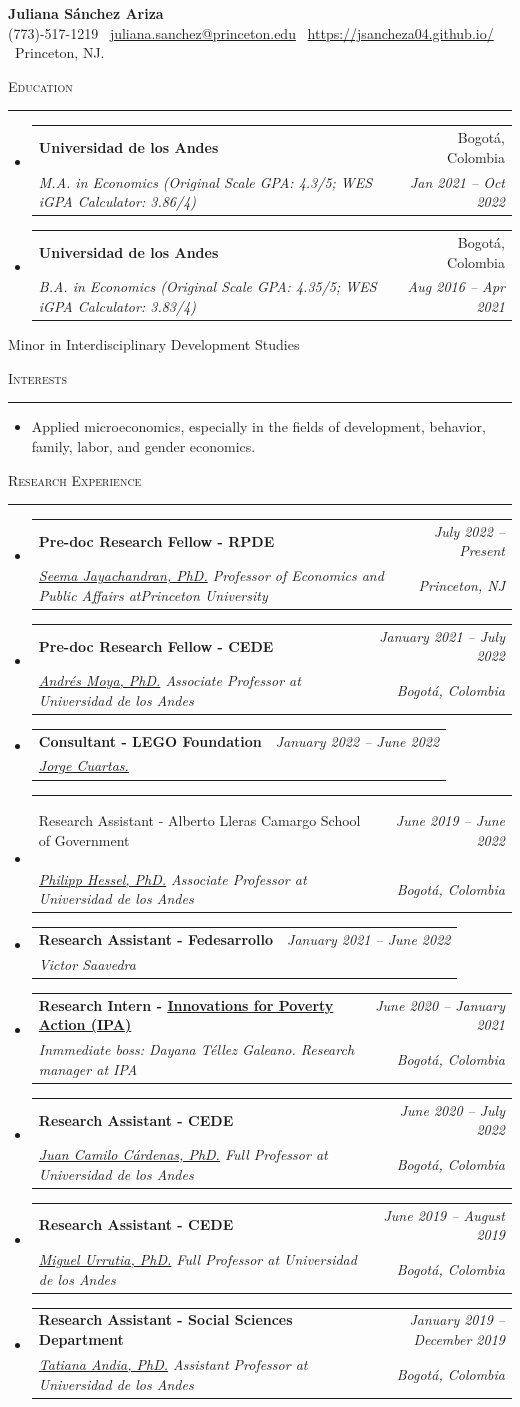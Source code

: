\documentclass[11pt,letterpaper]{article}
\makeatletter
\newcommand{\cvsection}[1]{%
  \vspace{11pt}%
  {\Large\scshape #1\par}%
  \vspace{3pt}\hrule\vspace{6pt}%
}
\newcommand{\entryliststart}{%
  \begin{itemize}[leftmargin=0.15in,label={},topsep=0pt,partopsep=0pt,
                  itemsep=0pt,parsep=0pt]
}
\newcommand{\entrylistend}{\end{itemize}}
\newcommand{\cventry}[4]{%
  \item
  \begin{tabular*}{0.97\textwidth}[t]{@{}p{0.71\textwidth}@{\extracolsep{\fill}}r@{}}
    {\raggedright\large\bfseries #1} & {\large #2} \\
    {\raggedright\itshape #3} & {\itshape #4} \\
  \end{tabular*}\vspace{5pt}%
}
\newcommand{\cvtextliststart}{%
  \begin{itemize}[leftmargin=0.15in,label={},topsep=0pt,partopsep=0pt,
                  itemsep=0pt,parsep=0pt]
}
\newcommand{\cvtextitem}[1]{\item #1\vspace{3pt}}
\newcommand{\cvtextlistend}{\end{itemize}}
\newcommand{\cvminor}[1]{%
  {\hspace*{16.08pt}\textbullet\hspace{5.85pt}#1\par}%
}
\makeatother
\begin{document}
\begin{center}
  {\Huge\bfseries Juliana S\'anchez Ariza}\\[-1pt]
  (773)-517-1219 \textbar\ 
  \href{mailto:juliana.sanchez@princeton.edu}{juliana.sanchez@princeton.edu}
  \textbar\ 
  \href{https://jsancheza04.github.io/}{https://jsancheza04.github.io/}
  \textbar\ Princeton, NJ.
\end{center}
\vspace{1pt}

\cvsection{Education}
\entryliststart
  \cventry{Universidad de los Andes}{Bogot\'a, Colombia}
    {M.A. in Economics (Original Scale GPA: 4.3/5; WES iGPA Calculator: 3.86/4)}
    {Jan 2021 -- Oct 2022}
  \cventry{Universidad de los Andes}{Bogot\'a, Colombia}
    {B.A. in Economics (Original Scale GPA: 4.35/5; WES iGPA Calculator: 3.83/4)}
    {Aug 2016 -- Apr 2021}
\entrylistend
\cvminor{Minor in Interdisciplinary Development Studies}

\cvsection{Interests}
\cvtextliststart
  \cvtextitem{Applied microeconomics, especially in the fields of development, behavior, family, labor, and gender economics.}
\cvtextlistend

\cvsection{Research Experience}
\entryliststart
  \cventry{Pre-doc Research Fellow - RPDE}{\textit{July 2022 -- Present}}
    {\href{https://seemajayachandran.com/}{Seema Jayachandran, PhD.} Professor of Economics and Public Affairs at\newline Princeton University}
    {Princeton, NJ}
  \cventry{Pre-doc Research Fellow - CEDE}{\textit{January 2021 -- July 2022}}
    {\href{https://economia.uniandes.edu.co/moya}{Andr\'es Moya, PhD.} Associate Professor at Universidad de los Andes}
    {Bogot\'a, Colombia}
  \cventry{Consultant - LEGO Foundation}{\textit{January 2022 -- June 2022}}
    {\href{https://scholar.harvard.edu/jorgecuartas/home}{Jorge Cuartas.}}
    {}
  \cventry{\parbox[t]{325pt}{\raggedright Research Assistant - Alberto Lleras Camargo School of Government}}
    {\textit{June 2019 -- June 2022}}
    {\href{https://scholar.google.com.co/citations?user=J4swKxAAAAAJ\&hl=en}{Philipp Hessel, PhD.} Associate Professor at Universidad de los Andes}
    {Bogot\'a, Colombia}
  \cventry{Research Assistant - Fedesarrollo}{\textit{January 2021 -- June 2022}}
    {Victor Saavedra}
    {}
  \cventry{Research Intern - \href{https://www.poverty-action.org/}{Innovations for Poverty Action (IPA)}}
    {\textit{June 2020 -- January 2021}}
    {Inmmediate boss: Dayana T\'ellez Galeano. Research manager at IPA}
    {Bogot\'a, Colombia}
  \cventry{Research Assistant - CEDE}{\textit{June 2020 -- July 2022}}
    {\href{https://economia.uniandes.edu.co/cardenas}{Juan Camilo C\'ardenas, PhD.} Full Professor at Universidad de los Andes}
    {Bogot\'a, Colombia}
  \cventry{Research Assistant - CEDE}{\textit{June 2019 -- August 2019}}
    {\href{https://economia.uniandes.edu.co/profesores/miguel-urrutia}{Miguel Urrutia, PhD.} Full Professor at Universidad de los Andes}
    {Bogot\'a, Colombia}
  \cventry{Research Assistant - Social Sciences Department}{\textit{January 2019 -- December 2019}}
    {\href{https://cienciassociales.uniandes.edu.co/profesores/tatiana-andia/}{Tatiana Andia, PhD.} Assistant Professor at Universidad de los Andes}
    {Bogot\'a, Colombia}
\entrylistend
\end{document}
